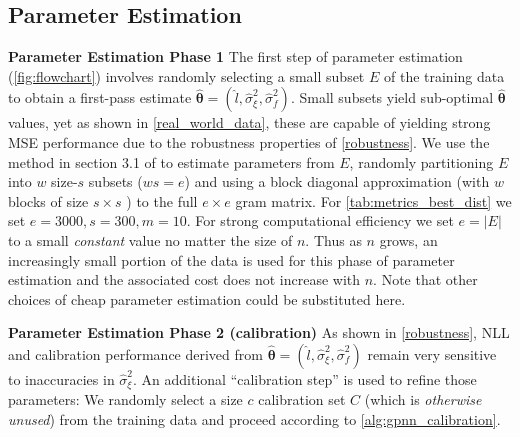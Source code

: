 \subsection{Parameter Estimation}
\label{parameter_estimation}
\textbf{Parameter Estimation Phase 1} The first step of parameter estimation (\autoref{fig:flowchart}) involves randomly selecting a small subset $E$ of the training data to obtain a first-pass estimate $\hat{\bm{\theta}} = (\hat{l},{\hat{\sigma}}_\xi^2,{\hat{\sigma}}_f^2)$. Small subsets yield sub-optimal $\hat{\bm{\theta}}$ values, yet as shown in \ref{real_world_data}, these are capable of yielding strong MSE performance due to the robustness properties of \autoref{robustness}. We use the method in section 3.1 of \cite{deisenroth2015distributed} to estimate parameters from $E$, randomly partitioning $E$ into $w$ size-$s$ subsets ($ws = e$) and using a block diagonal approximation (with $w$ blocks of size $s \times s$ ) to the full $e \times e$ gram matrix. For \autoref{tab:metrics_best_dist} we set $e = 3000,s = 300,m = 10$.  For strong computational efficiency we set $e=|E|$ to a small {\it constant} value no matter the size of $n$. Thus as $n$ grows, an increasingly small portion of the data is used for this phase of parameter estimation and the associated cost does not increase with $n$. Note that other choices of cheap parameter estimation could be substituted here.

\textbf{Parameter Estimation Phase 2 (calibration)} As shown in \autoref{robustness}, NLL and calibration performance derived from $\hat{\bm{\theta}} = (\hat{l},{\hat{\sigma}}_\xi^2,{\hat{\sigma}}_f^2)$ remain very sensitive to inaccuracies in $\hat{\sigma}_\xi^2$. An additional ``calibration step'' is used to refine those parameters: We randomly select a size $c$ calibration set $C$ (which is {\it otherwise unused}) from the training data and proceed according to \autoref{alg:gpnn_calibration}.


